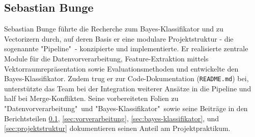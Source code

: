 \subsection{Sebastian Bunge}
\label{sec:sebastian}

Sebastian Bunge f\"uhrte die Recherche zum Bayes-Klassifikator und zu Vectorizern durch, auf deren Basis er eine modulare Projektstruktur - die sogenannte "Pipeline"\ - konzipierte und implementierte. Er realisierte zentrale Module f\"ur die Datenvorverarbeitung, Feature-Extraktion mittels Vektorraumrepr\"asentation sowie Evaluationsmethoden und entwickelte den Bayes-Klassifikator. Zudem trug er zur Code-Dokumentation (\texttt{README.md}) bei, unterst\"utzte das Team bei der Integration weiterer Ans\"atze in die Pipeline und half bei Merge-Konflikten. Seine vorbereiteten Folien zu "Datenvorverarbeitung"\ und "Bayes-Klassifikator"\ sowie seine Beitr\"age in den Berichtsteilen \ref{sec:sebastian}, \ref{sec:vorverarbeitung}, \ref{sec:bayes-klassifikator}, und \ref{sec:projektstruktur} dokumentieren seinen Anteil am Projektpraktikum.
